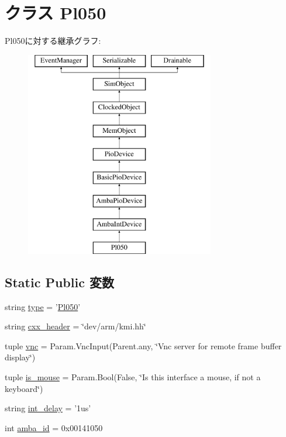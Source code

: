 \hypertarget{classRealView_1_1Pl050}{
\section{クラス Pl050}
\label{classRealView_1_1Pl050}
}
Pl050に対する継承グラフ:\begin{figure}[H]
\begin{center}
\leavevmode
\includegraphics[height=9cm]{classRealView_1_1Pl050}
\end{center}
\end{figure}
\subsection*{Static Public 変数}
\begin{DoxyCompactItemize}
\item 
string \hyperlink{classRealView_1_1Pl050_acce15679d830831b0bbe8ebc2a60b2ca}{type} = '\hyperlink{classRealView_1_1Pl050}{Pl050}'
\item 
string \hyperlink{classRealView_1_1Pl050_a17da7064bc5c518791f0c891eff05fda}{cxx\_\-header} = \char`\"{}dev/arm/kmi.hh\char`\"{}
\item 
tuple \hyperlink{classRealView_1_1Pl050_afe937f4b2d4f6f3abce13db1d308617d}{vnc} = Param.VncInput(Parent.any, \char`\"{}Vnc server for remote frame buffer display\char`\"{})
\item 
tuple \hyperlink{classRealView_1_1Pl050_ac89fcfdcd50917fad036a630d54495c4}{is\_\-mouse} = Param.Bool(False, \char`\"{}Is this interface a mouse, if not a keyboard\char`\"{})
\item 
string \hyperlink{classRealView_1_1Pl050_a143e0c2b2724ac7fcad9543c09b949ef}{int\_\-delay} = '1us'
\item 
int \hyperlink{classRealView_1_1Pl050_a38d7b9edfe6f0eea7a54e7e4f6253f3a}{amba\_\-id} = 0x00141050
\end{DoxyCompactItemize}


